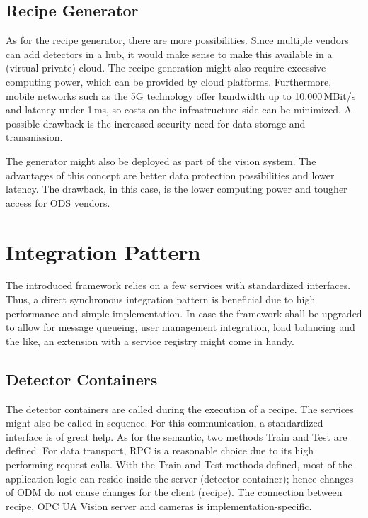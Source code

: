 \subsection{Recipe Generator}
As for the recipe generator, there are more possibilities. Since multiple vendors can add detectors in a hub, it would make sense to make this available in a (virtual private) cloud. The recipe generation might also require excessive computing power, which can be provided by cloud platforms. Furthermore, mobile networks such as the 5G technology offer bandwidth up to 10.000\,MBit/s and latency under 1\,ms, so costs on the infrastructure side can be minimized. A possible drawback is the increased security need for data storage and transmission.

The generator might also be deployed as part of the vision system. The advantages of this concept are better data protection possibilities and lower latency. The drawback, in this case, is the lower computing power and tougher access for ODS vendors.

\section{Integration Pattern}
The introduced framework relies on a few services with standardized interfaces. Thus, a direct synchronous integration pattern is beneficial due to high performance and simple implementation. In case the framework shall be upgraded to allow for message queueing, user management integration, load balancing and the like, an extension with a service registry might come in handy.

\subsection{Detector Containers}
The detector containers are called during the execution of a recipe. The services might also be called in sequence. For this communication, a standardized interface is of great help. As for the semantic, two methods Train and Test are defined. For data transport, RPC is a reasonable choice due to its high performing request calls. With the Train and Test methods defined, most of the application logic can reside inside the server (detector container); hence changes of ODM do not cause changes for the client (recipe). The connection between recipe, OPC UA Vision server and cameras is implementation-specific.

